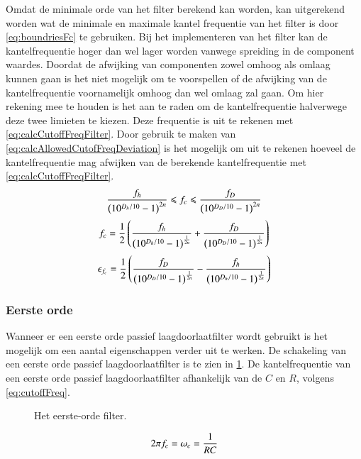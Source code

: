 Omdat de minimale orde van het filter berekend kan worden, kan uitgerekend worden wat de minimale en maximale kantel frequentie van het filter is door \cref{eq:boundriesFc} te gebruiken. Bij het implementeren van het filter kan de kantelfrequentie hoger dan wel lager worden vanwege spreiding in de component waardes. Doordat de afwijking van componenten zowel omhoog als omlaag kunnen gaan is het niet mogelijk om te voorspellen of de afwijking van de kantelfrequentie voornamelijk omhoog dan wel omlaag zal gaan. Om hier rekening mee te houden is het aan te raden om de kantelfrequentie halverwege deze twee limieten te kiezen. Deze frequentie is uit te rekenen met \cref{eq:calcCutoffFreqFilter}. Door gebruik te maken van \cref{eq:calcAllowedCutofFreqDeviation} is het mogelijk om uit te rekenen hoeveel de kantelfrequentie mag afwijken van de berekende kantelfrequentie met \cref{eq:calcCutoffFreqFilter}.
\begin{equation}\label{eq:boundriesFc}
    \frac{f_h}{\left(10^{D_h/10}-1\right)^{2n}}\leqslant f_c\leqslant\frac{f_D}{\left(10^{D_D/10}-1\right)^{2n}}
    \tagaddtext{[\si{\hertz}]}
\end{equation}
\begin{equation}\label{eq:calcCutoffFreqFilter}
    f_c=\frac{1}{2}\left(\frac{f_h}{\left(10^{D_h/10}-1\right)^{\frac{1}{2n}}}+\frac{f_D}{\left(10^{D_D/10}-1\right)^{\frac{1}{2n}}}\right)
    \tagaddtext{[\si{\hertz}]}
\end{equation}
\begin{equation}\label{eq:calcAllowedCutofFreqDeviation}
    \epsilon_{f_c}=\frac{1}{2}\left(\frac{f_D}{\left(10^{D_D/10}-1\right)^{\frac{1}{2n}}}-\frac{f_h}{\left(10^{D_h/10}-1\right)^{\frac{1}{2n}}}\right)
    \tagaddtext{[\si{\hertz}]}
\end{equation}

\subsubsection{Eerste orde}
Wanneer er een eerste orde passief laagdoorlaatfilter wordt gebruikt is het mogelijk om een aantal eigenschappen verder uit te werken.
De schakeling van een eerste orde passief laagdoorlaatfilter is te zien in \cref{fig:filterCircuit}. De kantelfrequentie van een eerste orde passief laagdoorlaatfilter afhankelijk van de $C$ en $R$, volgens \cref{eq:cutoffFreq}.
\begin{figure}[ht]
    \centering
    \def\svgwidth{0.3\textwidth}
    
    \caption{Het eerste-orde filter.}
    \label{fig:filterCircuit}
\end{figure}
\begin{equation} \label{eq:cutoffFreq}
    2\pi f_c = \omega_c = \frac{1}{RC}
    \tagaddtext{[\si{\radian\per\second}]}
\end{equation}

